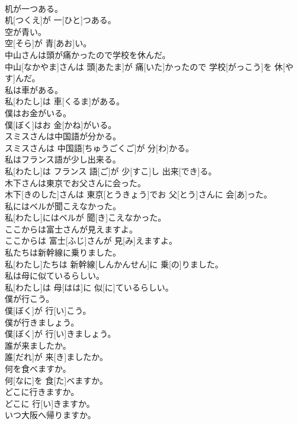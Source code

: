 \documentclass[8pt]{extreport}
\begin{document}
\begin{CJK}{UTF8}{min}
\\	机が一つある。	
\\	机[つくえ]が 一[ひと]つある。
\\	空が青い。	
\\	空[そら]が 青[あお]い。
\\	中山さんは頭が痛かったので学校を休んだ。	
\\	中山[なかやま]さんは 頭[あたま]が 痛[いた]かったので 学校[がっこう]を 休[やす]んだ。
\\	私は車がある。	
\\	私[わたし]は 車[くるま]がある。
\\	僕はお金がいる。	
\\	僕[ぼく]はお 金[かね]がいる。
\\	スミスさんは中国語が分かる。	
\\	スミスさんは 中国語[ちゅうごくご]が 分[わ]かる。
\\	私はフランス語が少し出来る。	
\\	私[わたし]は フランス 語[ご]が 少[すこ]し 出来[でき]る。
\\	木下さんは東京でお父さんに会った。	
\\	木下[きのした]さんは 東京[とうきょう]でお 父[とう]さんに 会[あ]った。
\\	私にはベルが聞こえなかった。	
\\	私[わたし]にはベルが 聞[き]こえなかった。
\\	ここからは富士さんが見えますよ。	
\\	ここからは 富士[ふじ]さんが 見[み]えますよ。
\\	私たちは新幹線に乗りました。	
\\	私[わたし]たちは 新幹線[しんかんせん]に 乗[の]りました。
\\	私は母に似ているらしい。	
\\	私[わたし]は 母[はは]に 似[に]ているらしい。
\\	僕が行こう。	
\\	僕[ぼく]が 行[い]こう。
\\	僕が行きましょう。	
\\	僕[ぼく]が 行[い]きましょう。
\\	誰が来ましたか。	
\\	誰[だれ]が 来[き]ましたか。
\\	何を食べますか。	
\\	何[なに]を 食[た]べますか。
\\	どこに行きますか。	
\\	どこに 行[い]きますか。
\\	いつ大阪へ帰りますか。	

\end{CJK}
\end{document}
